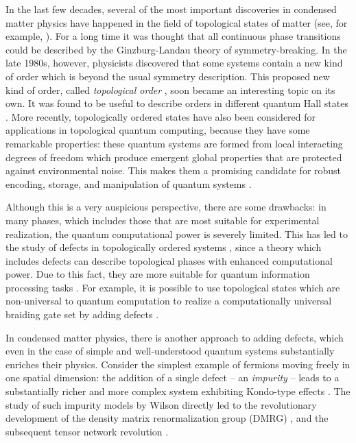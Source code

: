 
In the last few decades, several of the most important discoveries in condensed matter physics have happened in the field of topological states of matter (see, for example, \cite{Wen07,NSSFD08,HK10,QZ11}). For a long time it was thought that all continuous phase transitions could be described by the Ginzburg-Landau theory of symmetry-breaking. In the late 1980s, however, physicists discovered that some systems contain a new kind of order which is beyond the usual symmetry description. This proposed new kind of order, called \emph{topological order} \cite{Wen90}, soon became an interesting topic on its own. It was found to be useful to describe orders in different quantum Hall states \cite{WN90}. More recently, topologically ordered states have also been considered for applications in topological quantum computing, because they have some remarkable properties: these quantum systems are formed from local interacting degrees of freedom which produce emergent global properties that are protected against environmental noise. This makes them a promising candidate for robust encoding, storage, and manipulation of quantum systems \cite{DKLP2002,Kit03,NSSFD08,Ter15,PY15,BLPSW16}.

Although this is a very auspicious perspective, there are some drawbacks: in many phases, which includes those that are most suitable for experimental realization, the quantum computational power is severely limited. This has led to the study of defects in topologically ordered systems \cite{RH07,Bombin2010,KK12,FSV13,BJQ13b,BASP14,JPSV15,DIP16,CCW16,BBD17,CCW17b,CCW17,BLKW17,KPEB18,ET19}, since a theory which includes defects can describe topological phases with enhanced computational power. Due to this fact, they are more suitable for quantum information processing tasks \cite{Freedman1998,FLW02b,FLW02,FKLW02}. For example, it is possible to use topological states which are non-universal to quantum computation to realize a computationally universal braiding gate set by adding defects \cite{BJQ13}.

In condensed matter physics, there is another approach to adding defects, which even in the case of simple and well-understood quantum systems substantially enriches their physics. Consider the simplest example of fermions moving freely in one spatial dimension: the addition of a single defect -- an \emph{impurity} -- leads to a substantially richer and more complex system exhibiting Kondo-type effects \cite{andersonLocalizedMagneticStates1961,hewsonKondoProblemHeavy1997}. The study of such impurity models by Wilson \cite{wilsonRenormalizationGroupCritical1975} directly led to the revolutionary development of the density matrix renormalization group (DMRG) \cite{whiteDensityMatrixFormulation1992}, and the subsequent tensor network revolution \cite{bridgemanHandwavingInterpretiveDance2017}.

